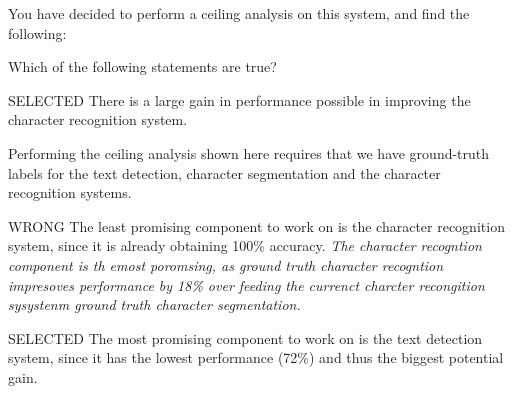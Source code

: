 \documentclass[11pt]{article} %
\begin{document}
You have decided to perform a ceiling analysis on this system, and find the following:


Which of the following statements are true?


SELECTED There is a large gain in performance possible in improving the character recognition system.

Performing the ceiling analysis shown here requires that we have ground-truth labels for the text detection, character segmentation and the character recognition systems.

WRONG The least promising component to work on is the character recognition system, since it is already obtaining 100\% accuracy.
\textit{The character recogntion component is th emost poromsing, as ground truth character recogntion  impresoves performance by 18\% over feeding the currenct charcter recongition sysystenm ground truth character segmentation.}

SELECTED The most promising component to work on is the text detection system, since it has the lowest performance (72\%) and thus the biggest potential gain.
\end{document}

